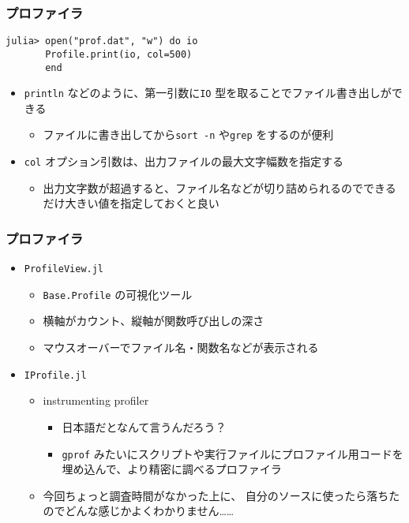 \begin{frame}[containsverbatim]
\frametitle{プロファイラ}
\begin{lstlisting}
julia> open("prof.dat", "w") do io
       Profile.print(io, col=500)
       end
\end{lstlisting}
\begin{itemize}
  \item \verb|println| などのように、第一引数に\verb|IO| 型を取ることでファイル書き出しができる
    \begin{itemize}
      \item ファイルに書き出してから\verb|sort -n| や\verb|grep| をするのが便利
    \end{itemize}
  \item \verb|col| オプション引数は、出力ファイルの最大文字幅数を指定する
    \begin{itemize}
      \item 出力文字数が超過すると、ファイル名などが切り詰められるのでできるだけ大きい値を指定しておくと良い
    \end{itemize}
\end{itemize}
\end{frame}

\begin{frame}[containsverbatim]
\frametitle{プロファイラ}
\begin{itemize}
\item \verb|ProfileView.jl|
  \begin{itemize}
    \item \verb|Base.Profile| の可視化ツール
    \item 横軸がカウント、縦軸が関数呼び出しの深さ
    \item マウスオーバーでファイル名・関数名などが表示される
  \end{itemize}
\item \verb|IProfile.jl|
  \begin{itemize}
    \item instrumenting profiler
      \begin{itemize}
        \item 日本語だとなんて言うんだろう？
        \item \verb|gprof| みたいにスクリプトや実行ファイルにプロファイル用コードを埋め込んで、より精密に調べるプロファイラ
      \end{itemize}
    \item 今回ちょっと調査時間がなかった上に、
      自分のソースに使ったら落ちたのでどんな感じかよくわかりません……
  \end{itemize}
\end{itemize}
\end{frame}

